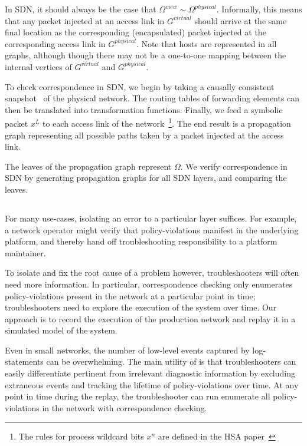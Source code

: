 In SDN, it should always be the case that 
$\Omega^{view} \sim \Omega^{physical}$. Informally, this means that
any packet injected at an access link in $G^{virtual}$ should arrive at
the same final location as the corresponding (encapsulated) packet injected at the
corresponding access link in $G^{physical}$. Note that hosts are represented
in all graphs, although though there may not be a one-to-one mapping between the
internal vertices of $G^{virtual}$ and $G^{physical}$.

To check correspondence in SDN, we begin by taking a causally consistent
snapshot~\cite{Chandy:1985:DSD:214451.214456} of the physical network. The routing
tables of forwarding elements can then be translated into transformation functions.
Finally, we feed a symbolic packet $x^L$ to each access link of the
network~\footnote{The rules for process wildcard bits $x^n$ are defined in
the HSA paper~\cite{hsa}}. The end result is a propagation graph representing all possible paths taken by a packet injected
at the access link.

The leaves of the propagation graph represent $\Omega$. We
verify correspondence in SDN by generating propagation graphs for all SDN layers,
and comparing the leaves.

\subsection{\SIMULATOR{}}

For many use-cases, isolating an error to a particular layer suffices.
For example, a network operator might verify that policy-violations manifest in
the underlying platform, and thereby hand off
troubleshooting responsibility to a platform maintainer.

To isolate and fix the root cause of a problem however, troubleshooters will often
need more information. In particular, correspondence checking only enumerates
policy-violations present in the network at a particular point in time;
troubleshooters need to explore the execution of the system over
time. Our approach is to record the execution of the production network and replay 
it in a simulated model of the system.

Even in small networks, the number of low-level events captured by
log-statements can be overwhelming. The main utility of \simulator{} is that
troubleshooters can easily differentiate pertinent from
irrelevant diagnostic information by excluding extraneous events and
tracking the lifetime of policy-violations over time. At any point in time
during the replay, the troubleshooter
can run enumerate all policy-violations in the 
network with correspondence checking.


